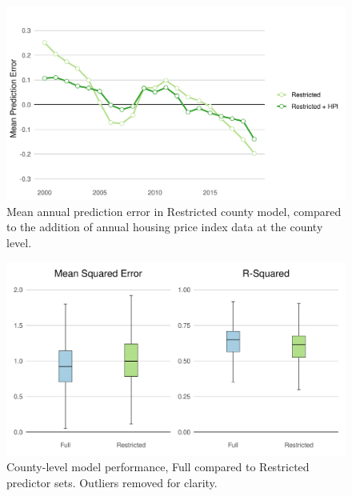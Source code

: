 \documentclass[12pt]{article}
\begin{document}
\begin{figure}[H]
    \centering
    \includegraphics[width=1\textwidth]{exhibits/nolte_resid_time.png}
    \caption{Mean annual prediction error in Restricted county model, compared to the addition of annual housing price index data at the county level.}
    \label{fig:nolte_resid_time}
\end{figure}

\begin{figure}[H]
    \centering
    \includegraphics[width=1\textwidth]{exhibits/county_compare_boxplot.png}
    \caption{County-level model performance, Full compared to Restricted predictor sets. Outliers removed for clarity.}
    \label{fig:county_compare_boxplot}
\end{figure}
\end{document}

